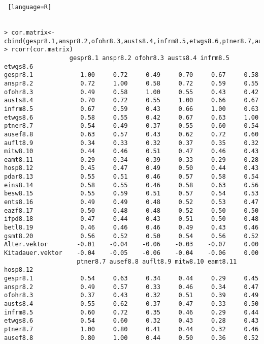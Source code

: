 \begin{lstlisting} [language=R]


> cor.matrix<-cbind(gespr8.1,anspr8.2,ofohr8.3,austs8.4,infrm8.5,etwgs8.6,ptner8.7,ausef8.8,auflt8.9,mitw8.10,eamt8.11,hosp8.12,pdar8.13,eins8.14,besw8.15,ents8.16,eazf8.17,ifpd8.18,betl8.19,gsmt8.20)
> rcorr(cor.matrix)
                  gespr8.1 anspr8.2 ofohr8.3 austs8.4 infrm8.5 etwgs8.6
gespr8.1             1.00     0.72     0.49     0.70     0.67     0.58
anspr8.2             0.72     1.00     0.58     0.72     0.59     0.55
ofohr8.3             0.49     0.58     1.00     0.55     0.43     0.42
austs8.4             0.70     0.72     0.55     1.00     0.66     0.67
infrm8.5             0.67     0.59     0.43     0.66     1.00     0.63
etwgs8.6             0.58     0.55     0.42     0.67     0.63     1.00
ptner8.7             0.54     0.49     0.37     0.55     0.60     0.54
ausef8.8             0.63     0.57     0.43     0.62     0.72     0.60
auflt8.9             0.34     0.33     0.32     0.37     0.35     0.32
mitw8.10             0.44     0.46     0.51     0.47     0.46     0.43
eamt8.11             0.29     0.34     0.39     0.33     0.29     0.28
hosp8.12             0.45     0.47     0.49     0.50     0.44     0.43
pdar8.13             0.55     0.51     0.46     0.57     0.58     0.54
eins8.14             0.58     0.55     0.46     0.58     0.63     0.56
besw8.15             0.55     0.59     0.51     0.57     0.54     0.53
ents8.16             0.49     0.49     0.48     0.52     0.53     0.47
eazf8.17             0.50     0.48     0.48     0.52     0.50     0.50
ifpd8.18             0.47     0.44     0.43     0.51     0.50     0.48
betl8.19             0.46     0.46     0.46     0.49     0.43     0.46
gsmt8.20             0.56     0.52     0.50     0.54     0.56     0.52
Alter.vektor        -0.01    -0.04    -0.06    -0.03    -0.07     0.00
Kitadauer.vektor    -0.04    -0.05    -0.06    -0.04    -0.06     0.00
                    ptner8.7 ausef8.8 auflt8.9 mitw8.10 eamt8.11 hosp8.12
gespr8.1             0.54     0.63     0.34     0.44     0.29     0.45
anspr8.2             0.49     0.57     0.33     0.46     0.34     0.47
ofohr8.3             0.37     0.43     0.32     0.51     0.39     0.49
austs8.4             0.55     0.62     0.37     0.47     0.33     0.50
infrm8.5             0.60     0.72     0.35     0.46     0.29     0.44
etwgs8.6             0.54     0.60     0.32     0.43     0.28     0.43
ptner8.7             1.00     0.80     0.41     0.44     0.32     0.46
ausef8.8             0.80     1.00     0.44     0.50     0.36     0.52

\end{lstlisting}
